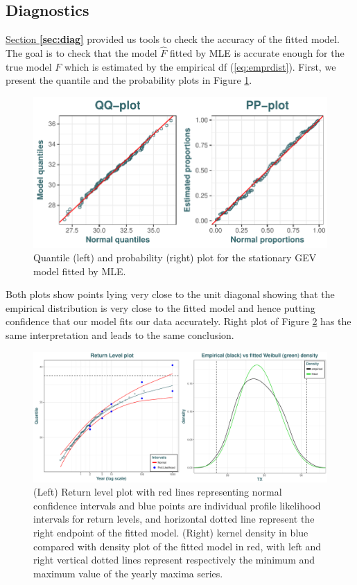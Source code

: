 \subsection{Diagnostics}

\hyperref[sec:diag]{Section \textbf{\ref{sec:diag}}} provided us tools to check the accuracy of the fitted model. The goal is to check that the
model $\hat{F}$ fitted by MLE is accurate enough for the true model $F$ which is estimated by the empirical df
(\ref{eq:emprdist}). First, we present the quantile and the probability plots in Figure \ref{fig:ppqqplot}.

\begin{figure}[!htb]
	\centering	\includegraphics[width=.7\linewidth]{pp_qqplot.pdf}\caption{Quantile (left) and probability (right) plot for the stationary GEV model fitted by MLE.}\label{fig:ppqqplot}
\end{figure}

Both plots show points lying very close to the unit diagonal showing that the empirical distribution
is very close to the fitted model and hence putting confidence that our model fits our data accurately.
Right plot of Figure \ref{fig:rl_empdes} has the same interpretation and leads to the same conclusion.

\begin{figure}[!htb]
	\centering	\includegraphics[width=.75\linewidth]{rl_empdes.pdf}\caption{(Left) Return level plot with red lines representing normal confidence intervals and blue points are individual profile likelihood intervals for return levels, and horizontal dotted line represent the right endpoint of the	fitted model. (Right) kernel density in blue compared with density plot of the fitted model in red, with left and right	vertical dotted lines represent respectively the minimum and maximum value of the yearly maxima series.}\label{fig:rl_empdes}
\end{figure}


